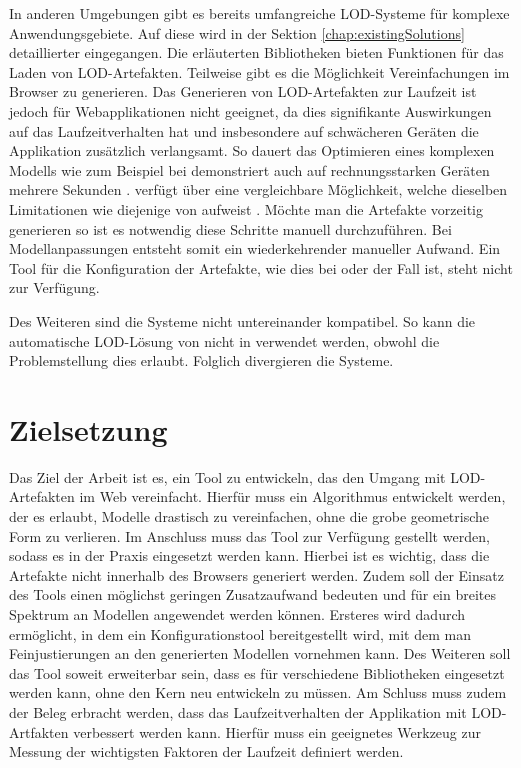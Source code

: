 In anderen Umgebungen gibt es bereits umfangreiche LOD-Systeme für komplexe Anwendungsgebiete. Auf diese wird in der Sektion \autoref{chap:existingSolutions} detaillierter eingegangen.
Die erläuterten Bibliotheken bieten Funktionen für das Laden von LOD-Artefakten. Teilweise gibt es die Möglichkeit Vereinfachungen im Browser zu generieren. Das Generieren von LOD-Artefakten zur Laufzeit ist jedoch für Webapplikationen nicht geeignet, da dies signifikante Auswirkungen auf das Laufzeitverhalten hat und insbesondere auf schwächeren Geräten die Applikation zusätzlich verlangsamt.
So dauert das Optimieren eines komplexen Modells wie zum Beispiel bei  demonstriert auch auf rechnungsstarken Geräten mehrere Sekunden \cite{babylonAutoLod}.  verfügt über eine vergleichbare Möglichkeit, welche dieselben Limitationen wie diejenige von  aufweist \cite{threeSimplifyModifier}. Möchte man die Artefakte vorzeitig generieren so ist es notwendig diese Schritte manuell durchzuführen. Bei Modellanpassungen entsteht somit ein wiederkehrender manueller Aufwand. Ein Tool für die Konfiguration der Artefakte, wie dies bei  oder  der Fall ist, steht nicht zur Verfügung.

Des Weiteren sind die Systeme nicht untereinander kompatibel. So kann die automatische LOD-Lösung von  nicht in  verwendet werden, obwohl die Problemstellung dies erlaubt. Folglich divergieren die Systeme.

\section{Zielsetzung}
Das Ziel der Arbeit ist es, ein Tool zu entwickeln, das den Umgang mit LOD-Artefakten im Web vereinfacht. Hierfür muss ein Algorithmus entwickelt werden, der es erlaubt, Modelle drastisch zu vereinfachen, ohne die grobe geometrische Form zu verlieren. Im Anschluss muss das Tool zur Verfügung gestellt werden, sodass es in der Praxis eingesetzt werden kann. Hierbei ist es wichtig, dass die Artefakte nicht innerhalb des Browsers generiert werden. Zudem soll der Einsatz des Tools einen möglichst geringen Zusatzaufwand bedeuten und für ein breites Spektrum an Modellen angewendet werden können. Ersteres wird dadurch ermöglicht, in dem ein Konfigurationstool bereitgestellt wird, mit dem man Feinjustierungen an den generierten Modellen vornehmen kann. Des Weiteren soll das Tool soweit erweiterbar sein, dass es für verschiedene Bibliotheken eingesetzt werden kann, ohne den Kern neu entwickeln zu müssen. Am Schluss muss zudem der Beleg erbracht werden, dass das Laufzeitverhalten der Applikation mit LOD-Artfakten verbessert werden kann. Hierfür muss ein geeignetes Werkzeug zur Messung der wichtigsten Faktoren der Laufzeit definiert werden.
